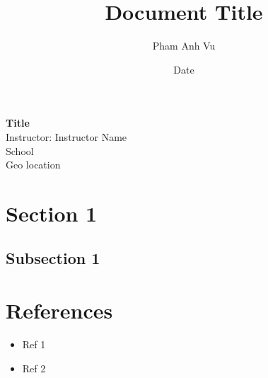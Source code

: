 \documentclass[12pt]{article}
\title{Document Title}
\author{Pham Anh Vu}
\date{Date}
\begin{document}
    \begin{titlepage}
        \maketitle
        \begin{center}
            \vspace{0.5cm}
            \textbf{Title}\\

            \vspace{2cm}
            Instructor: Instructor Name\\

            \vspace{8cm}
            School\\
            Geo location\\
        \end{center}
    \end{titlepage}

    \tableofcontents

    \newpage
    \section{Section 1}
        \subsection{Subsection 1}
    
    \newpage
    \section{References}
    \begin{itemize}
        \item Ref 1
        \item Ref 2
      \end{itemize}
\end{document}
